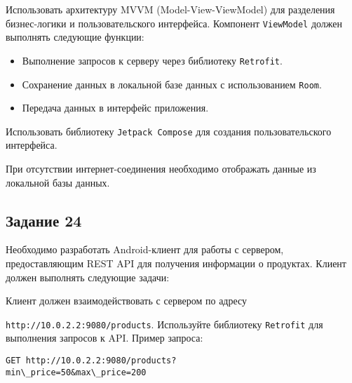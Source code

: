 \documentclass[a4paper,12pt]{article}
\begin{document}
Использовать архитектуру MVVM (Model-View-ViewModel) для разделения бизнес-логики и пользовательского интерфейса. Компонент \texttt{ViewModel} должен выполнять следующие функции:
\begin{itemize}
    \item Выполнение запросов к серверу через библиотеку \texttt{Retrofit}.
    \item Сохранение данных в локальной базе данных с использованием \texttt{Room}.
    \item Передача данных в интерфейс приложения.
\end{itemize}

Использовать библиотеку \texttt{Jetpack Compose} для создания пользовательского интерфейса.

При отсутствии интернет-соединения необходимо отображать данные из локальной базы данных.

\subsection*{Задание 24}

Необходимо разработать Android-клиент для работы с сервером, предоставляющим REST API для получения информации о продуктах. Клиент должен выполнять следующие задачи:

Клиент должен взаимодействовать с сервером по адресу 

\texttt{http://10.0.2.2:9080/products}. Используйте библиотеку \texttt{Retrofit} для выполнения запросов к API. Пример запроса:

\begin{verbatim}
GET http://10.0.2.2:9080/products?
min\_price=50&max\_price=200
\end{verbatim}
\end{document}
